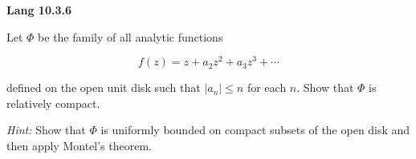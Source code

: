 \textbf{Lang 10.3.6}

Let $\Phi$ be the family of all analytic functions

$$
f(z) = z + a_2 z^2 + a_3 z^3 + \cdots
$$

defined on the open unit disk such that $|a_n| \le n$ for each $n$. Show that $\Phi$ is relatively compact.

\textit{Hint:} Show that $\Phi$ is uniformly bounded on compact subsets of the open disk and then apply Montel's 
theorem.

\begin{solution}
  \ \\
\end{solution}
